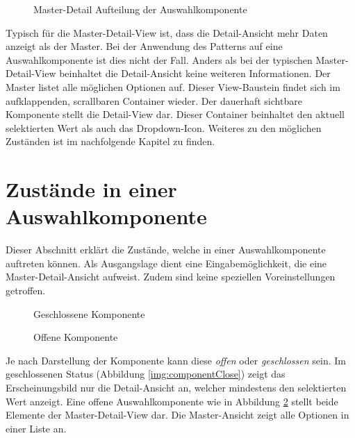 \begin{figure}[!htb] %
    \centering
    \caption{\color{red} Master-Detail Aufteilung der Auswahlkomponente}
    \label{img:masterDetailView}
\end{figure}

Typisch für die Master-Detail-View ist, dass die Detail-Ansicht mehr Daten anzeigt als der Master.
Bei der Anwendung des Patterns auf eine Auswahlkomponente ist dies nicht der Fall.
Anders als bei der typischen Master-Detail-View beinhaltet die Detail-Ansicht keine weiteren Informationen.
Der Master listet alle möglichen Optionen auf.
Dieser View-Baustein findet sich im aufklappenden, scrallbaren Container wieder.
Der dauerhaft sichtbare Komponente stellt die Detail-View dar.
Dieser Container beinhaltet den aktuell selektierten Wert als auch das Dropdown-Icon.
Weiteres zu den möglichen Zuständen ist im nachfolgende Kapitel zu finden.


\section{Zustände in einer Auswahlkomponente}
\label{sec:states}

Dieser Abschnitt erklärt die Zustände, welche in einer Auswahlkomponente auftreten können.
Als Ausgangslage dient eine Eingabemöglichkeit, die eine Master-Detail-Ansicht aufweist.
Zudem sind keine speziellen Voreinstellungen getroffen.

\begin{figure}[!htb] %
    \centering
    \begin{minipage}[b]{0.45\textwidth}
        \centering
        \caption{\color{red} Geschlossene Komponente}
        \label{img:componentClose}
    \end{minipage}
    \hfill
    \begin{minipage}[b]{0.45\textwidth}
        \centering
        \caption{\color{red} Offene Komponente}
        \label{img:componentOpen}
    \end{minipage}
\end{figure}

Je nach Darstellung der Komponente kann diese \emph{offen} oder \emph{geschlossen} sein.
Im geschlossenen Status (Abbildung \ref{img:componentClose}) zeigt das Erscheinungsbild nur die Detail-Ansicht an, welcher mindestens den selektierten Wert anzeigt.
Eine offene Auswahlkomponente wie in Abbildung \ref{img:componentOpen} stellt beide Elemente der Master-Detail-View dar.
Die Master-Ansicht zeigt alle Optionen in einer Liste an.

